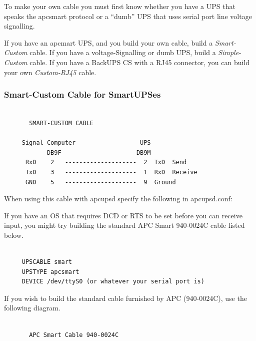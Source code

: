 {{{{{{{{{{To make your own cable you must first know whether you have a UPS that speaks
the apcsmart protocol or a ``dumb'' UPS that uses serial port line voltage
signalling.  

If you have an apcmart UPS, and you build your own cable, build a {\it
Smart-Custom} cable. If you have a voltage-Signalling or dumb UPS, build a
{\it Simple-Custom} cable. If you have a BackUPS CS with a RJ45 connector, you
can build your own {\it Custom-RJ45} cable. 

\label{Smart_002dCustom-Cable-for-SmartUPSes}

\subsubsection*{Smart-Custom Cable for SmartUPSes}

\label{index-Smart-Custom-Cable-192}
\label{index-Cables_002c-Smart-Custom-193}

\footnotesize
\begin{verbatim}
     
       SMART-CUSTOM CABLE
     
     Signal Computer                  UPS
            DB9F                     DB9M
      RxD    2   --------------------  2  TxD  Send
      TxD    3   --------------------  1  RxD  Receive
      GND    5   --------------------  9  Ground
\end{verbatim}
\normalsize

When using this cable with apcupsd specify the following in apcupsd.conf:  

If you have an OS that requires DCD or RTS to be set before you can receive
input, you might try building the standard APC Smart 940-0024C cable listed
below. 

\footnotesize
\begin{verbatim}
     
     UPSCABLE smart
     UPSTYPE apcsmart
     DEVICE /dev/ttyS0 (or whatever your serial port is)
\end{verbatim}
\normalsize

If you wish to build the standard cable furnished by APC (940-0024C), use the
following diagram. 

\footnotesize
\begin{verbatim}
     
       APC Smart Cable 940-0024C
     

\end{verbatim}}}}}}}}}}}
